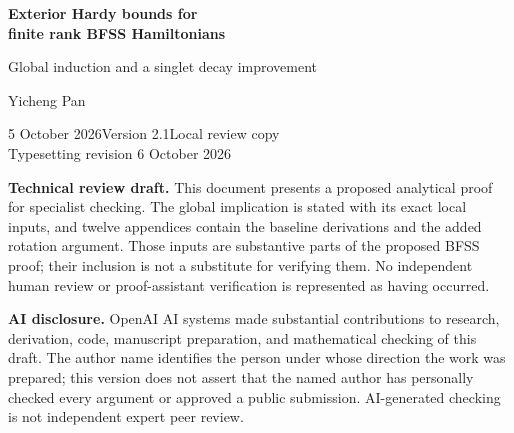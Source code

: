 \documentclass[11pt,letterpaper]{article}
\theoremstyle{definition}\newtheorem{hypothesis}[theorem]{Hypothesis}
\numberwithin{equation}{section}
\begin{document}
\begin{titlepage}
\vspace*{0.2in}
{\LARGE\bfseries Exterior Hardy bounds for\\[4pt]finite rank BFSS Hamiltonians\par}
\vspace{0.25in}
{\large Global induction and a singlet decay improvement\par}
\vspace{0.35in}
{\large Yicheng Pan\par}
{5 October 2026\quad Version 2.1\quad Local review copy\\[2pt]Typesetting revision 6 October 2026\par}
\vspace{0.3in}
\textbf{Technical review draft.} This document presents a proposed analytical proof for specialist checking. The global implication is stated with its exact local inputs, and twelve appendices contain the baseline derivations and the added rotation argument. Those inputs are substantive parts of the proposed BFSS proof; their inclusion is not a substitute for verifying them. No independent human review or proof-assistant verification is represented as having occurred.

\textbf{AI disclosure.} OpenAI AI systems made substantial contributions to research, derivation, code, manuscript preparation, and mathematical checking of this draft. The author name identifies the person under whose direction the work was prepared; this version does not assert that the named author has personally checked every argument or approved a public submission. AI-generated checking is not independent expert peer review.


\end{titlepage}
\end{document}
